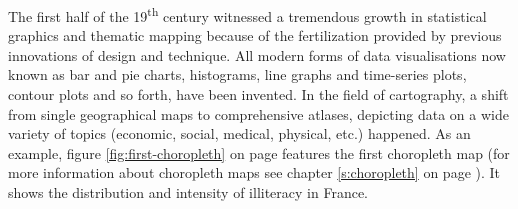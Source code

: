 The first half of the 19\textsuperscript{th} century witnessed a tremendous growth in statistical graphics and thematic mapping because of the fertilization provided by previous innovations of design and technique. All modern forms of data visualisations now known as bar and pie charts, histograms, line graphs and time-series plots, contour plots and so forth, have been invented. In the field of cartography, a shift from single geographical maps to comprehensive atlases, depicting data on a wide variety of topics (economic, social, medical, physical, etc.) happened. As an example, figure \ref{fig:first-choropleth} on page \pageref{fig:first-choropleth} features the first choropleth map (for more information about choropleth maps see chapter \ref{s:choropleth} on page \pageref{s:choropleth}). It shows the distribution and intensity of illiteracy in France.

